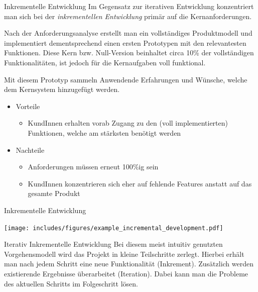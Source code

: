 \begin{defi}{Inkrementelle Entwicklung}
    Im Gegensatz zur iterativen Entwicklung konzentriert man sich bei der \emph{inkrementellen Entwicklung} primär auf die Kernanforderungen.

    Nach der Anforderungsanalyse erstellt man ein vollständiges Produktmodell und implementiert dementsprechend einen ersten Prototypen mit den relevantesten Funktionen.
    Diese Kern bzw. Null-Version beinhaltet circa 10\% der vollständigen Funktionalitäten, ist jedoch für die Kernaufgaben voll funktional.

    Mit diesem Prototyp sammeln Anwendende Erfahrungen und Wünsche, welche dem Kernsystem hinzugefügt werden.

    \begin{itemize}
        \item Vorteile
              \begin{itemize}
                  \item KundInnen erhalten vorab Zugang zu den (voll implementierten) Funktionen, welche am stärksten benötigt werden
              \end{itemize}
        \item Nachteile
              \begin{itemize}
                  \item Anforderungen müssen erneut 100\%ig sein
                  \item KundInnen konzentrieren sich eher auf fehlende Features anstatt auf das gesamte Produkt
              \end{itemize}
    \end{itemize}
\end{defi}

\begin{example}{Inkrementelle Entwicklung}
    \begin{center}
        \texttt{[image: includes/figures/example\_incremental\_development.pdf]}
    \end{center}
\end{example}

\begin{defi}{Iterativ Inkrementelle Entwicklung}
    Bei diesem meist intuitiv genutzten Vorgehensmodell wird das Projekt in kleine Teilschritte zerlegt.
    Hierbei erhält man nach jedem Schritt eine neue Funktionalität (Inkrement).
    Zusätzlich werden existierende Ergebnisse überarbeitet (Iteration).
    Dabei kann man die Probleme des aktuellen Schritts im Folgeschritt lösen.
\end{defi}

